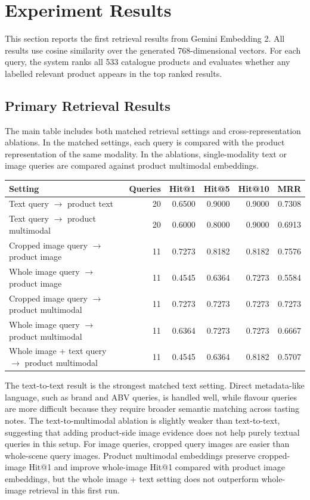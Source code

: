 \section{Experiment Results}

This section reports the first retrieval results from Gemini Embedding 2. All results use cosine similarity over the generated 768-dimensional vectors. For each query, the system ranks all 533 catalogue products and evaluates whether any labelled relevant product appears in the top ranked results.

\subsection{Primary Retrieval Results}

The main table includes both matched retrieval settings and cross-representation ablations. In the matched settings, each query is compared with the product representation of the same modality. In the ablations, single-modality text or image queries are compared against product multimodal embeddings.

\begin{center}
\scriptsize
\begin{tabular}{p{}rrrrr}
\hline
\textbf{Setting} & \textbf{Queries} & \textbf{Hit@1} & \textbf{Hit@5} & \textbf{Hit@10} & \textbf{MRR} \\
\hline
Text query $\rightarrow$ product text & 20 & 0.6500 & 0.9000 & 0.9000 & 0.7308 \\
Text query $\rightarrow$ product multimodal & 20 & 0.6000 & 0.8000 & 0.9000 & 0.6913 \\
\hline
Cropped image query $\rightarrow$ product image & 11 & 0.7273 & 0.8182 & 0.8182 & 0.7576 \\
Whole image query $\rightarrow$ product image & 11 & 0.4545 & 0.6364 & 0.7273 & 0.5584 \\
\hline
Cropped image query $\rightarrow$ product multimodal & 11 & 0.7273 & 0.7273 & 0.7273 & 0.7273 \\
Whole image query $\rightarrow$ product multimodal & 11 & 0.6364 & 0.7273 & 0.7273 & 0.6667 \\
\hline
Whole image + text query $\rightarrow$ product multimodal & 11 & 0.4545 & 0.6364 & 0.8182 & 0.5707 \\
\hline
\end{tabular}
\end{center}

The text-to-text result is the strongest matched text setting. Direct metadata-like language, such as brand and ABV queries, is handled well, while flavour queries are more difficult because they require broader semantic matching across tasting notes. The text-to-multimodal ablation is slightly weaker than text-to-text, suggesting that adding product-side image evidence does not help purely textual queries in this setup. For image queries, cropped query images are easier than whole-scene query images. Product multimodal embeddings preserve cropped-image Hit@1 and improve whole-image Hit@1 compared with product image embeddings, but the whole image + text setting does not outperform whole-image retrieval in this first run.

